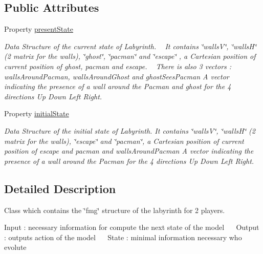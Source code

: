 \subsection*{Public Attributes}
\begin{DoxyCompactItemize}
\item 
Property \hyperlink{class_model_laby_a9624cc7c421a50fa5086b0ebd0cd5fe3}{present\+State}
\begin{DoxyCompactList}\small\item\em Data Structure of the current state of Labyrinth. ~\newline
 It contains \char`\"{}walls\+V\char`\"{}, \char`\"{}walls\+H\char`\"{} (2 matrix for the walls), \char`\"{}ghost\char`\"{}, \char`\"{}pacman\char`\"{} and \char`\"{}escape\char`\"{} , a Cartesian position of current position of ghost, pacman and escape. ~\newline
 There is also 3 vectors \+: \textquotesingle{}walls\+Around\+Pacman\textquotesingle{}, \textquotesingle{}walls\+Around\+Ghost\textquotesingle{} and \textquotesingle{}ghost\+Sees\+Pacman\textquotesingle{} A vector indicating the presence of a wall around the Pacman and ghost for the 4 directions Up Down Left Right. \end{DoxyCompactList}\item 
Property \hyperlink{class_model_laby_acd9263acfa96c9138afdf497e55acc24}{initial\+State}
\begin{DoxyCompactList}\small\item\em Data Structure of the initial state of Labyrinth. It contains \char`\"{}walls\+V\char`\"{}, \char`\"{}walls\+H\char`\"{} (2 matrix for the walls), \char`\"{}escape\char`\"{} and \char`\"{}pacman\char`\"{}, a Cartesian position of current position of escape and pacman and \textquotesingle{}walls\+Around\+Pacman\textquotesingle{} A vector indicating the presence of a wall around the Pacman for the 4 directions Up Down Left Right. \end{DoxyCompactList}\end{DoxyCompactItemize}


\subsection{Detailed Description}
Class which contains the \char`\"{}fmg\char`\"{} structure of the labyrinth for 2 players. 

Input \+: necessary information for compute the next state of the model~\newline
~\newline
 Output \+: output\textquotesingle{}s action of the model~\newline
 ~\newline
 State \+: minimal information necessary who evolute 

